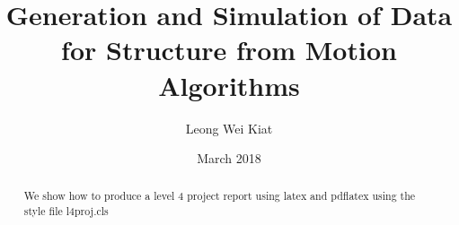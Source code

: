 \documentclass{l4proj}
\begin{document}
\title{Generation and Simulation of Data for Structure from Motion Algorithms}
\author{Leong Wei Kiat}
\date{March 2018}
\maketitle


\begin{abstract}
We show how to produce a level 4 project report using latex and pdflatex using the 
style file l4proj.cls
\end{abstract}

\educationalconsent

%
%
\tableofcontents
\end{document}
